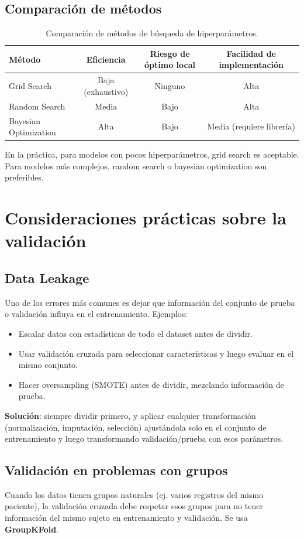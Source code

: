 \documentclass[12pt,a4paper,openany,oneside]{book}
\begin{document}
\subsection{Comparación de métodos}
\begin{table}[h]
\centering
\begin{tabular}{|l|c|c|c|}
\hline
\textbf{Método} & \textbf{Eficiencia} & \textbf{Riesgo de óptimo local} & \textbf{Facilidad de implementación} \\
\hline
Grid Search & Baja (exhaustivo) & Ninguno & Alta \\
Random Search & Media & Bajo & Alta \\
Bayesian Optimization & Alta & Bajo & Media (requiere librería) \\
\hline
\end{tabular}
\caption{Comparación de métodos de búsqueda de hiperparámetros.}
\end{table}

En la práctica, para modelos con pocos hiperparámetros, grid search es aceptable. Para modelos más complejos, random search o bayesian optimization son preferibles.

\section{Consideraciones prácticas sobre la validación}

\subsection{Data Leakage}
Uno de los errores más comunes es dejar que información del conjunto de prueba o validación influya en el entrenamiento. Ejemplos:
\begin{itemize}
    \item Escalar datos con estadísticas de todo el dataset antes de dividir.
    \item Usar validación cruzada para seleccionar características y luego evaluar en el mismo conjunto.
    \item Hacer oversampling (SMOTE) antes de dividir, mezclando información de prueba.
\end{itemize}
\textbf{Solución}: siempre dividir primero, y aplicar cualquier transformación (normalización, imputación, selección) ajustándola solo en el conjunto de entrenamiento y luego transformando validación/prueba con esos parámetros.

\subsection{Validación en problemas con grupos}
Cuando los datos tienen grupos naturales (ej. varios registros del mismo paciente), la validación cruzada debe respetar esos grupos para no tener información del mismo sujeto en entrenamiento y validación. Se usa \textbf{GroupKFold}.
\end{document}
